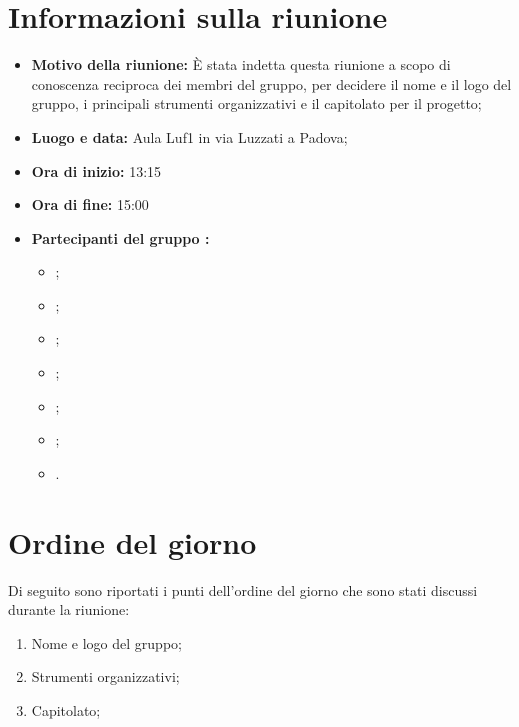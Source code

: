 \documentclass[VER-2017-12-08.tex]{subfiles}
\begin{document}
\chapter{Informazioni sulla riunione}
\begin{itemize}
	\item \textbf{Motivo della riunione:} \`{E} stata indetta questa riunione a scopo di conoscenza reciproca dei membri del gruppo, per decidere il nome e il logo del gruppo, i principali strumenti organizzativi e il capitolato per il progetto;
	\item \textbf{Luogo e data:} Aula Luf1 in via Luzzati a Padova;
	\item \textbf{Ora di inizio:} 13:15
	\item \textbf{Ora di fine:} 15:00
	\item \textbf{Partecipanti del gruppo \gruppo:}
	\begin{itemize}
		\item \Davide;
		\item \Elena;
		\item \Gianluca;
		\item \Mirco;
		\item \Parwinder;
		\item \Riccardo;
		\item \Valentina.
	\end{itemize}
\end{itemize}
\chapter{Ordine del giorno}	
Di seguito sono riportati i punti dell'ordine del giorno che sono stati discussi durante la riunione:
\begin{enumerate}
	\item Nome e logo del gruppo;
	\item Strumenti organizzativi;
	\item Capitolato;
\end{enumerate}
\end{document}
